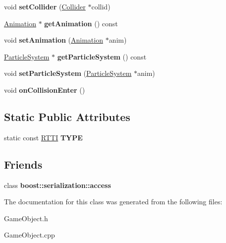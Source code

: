 \begin{DoxyCompactItemize}
\item 
\hypertarget{class_game_object_a1c60d09ac4284c98074c91c3f2a3bd76}{
void {\bfseries setCollider} (\hyperlink{class_collider}{Collider} $\ast$collid)}
\label{class_game_object_a1c60d09ac4284c98074c91c3f2a3bd76}

\item 
\hypertarget{class_game_object_a8ee01bb9d3bf665bcdd7b01d0afa0f83}{
\hyperlink{class_animation}{Animation} $\ast$ {\bfseries getAnimation} () const }
\label{class_game_object_a8ee01bb9d3bf665bcdd7b01d0afa0f83}

\item 
\hypertarget{class_game_object_a843c29431fdc35c948d7049eea8d4a5d}{
void {\bfseries setAnimation} (\hyperlink{class_animation}{Animation} $\ast$anim)}
\label{class_game_object_a843c29431fdc35c948d7049eea8d4a5d}

\item 
\hypertarget{class_game_object_af346844a9eb537a6f5255b4af5c52439}{
\hyperlink{class_particle_system}{ParticleSystem} $\ast$ {\bfseries getParticleSystem} () const }
\label{class_game_object_af346844a9eb537a6f5255b4af5c52439}

\item 
\hypertarget{class_game_object_a3b85c8ce97b7720349707d92fc71c273}{
void {\bfseries setParticleSystem} (\hyperlink{class_particle_system}{ParticleSystem} $\ast$anim)}
\label{class_game_object_a3b85c8ce97b7720349707d92fc71c273}

\item 
\hypertarget{class_game_object_a7fddf97069213113a53d993a29255985}{
void {\bfseries onCollisionEnter} ()}
\label{class_game_object_a7fddf97069213113a53d993a29255985}

\end{DoxyCompactItemize}
\subsection*{Static Public Attributes}
\begin{DoxyCompactItemize}
\item 
\hypertarget{class_game_object_a5dce9d375b69a47b73ce1dd53bf01cc6}{
static const \hyperlink{class_r_t_t_i}{RTTI} {\bfseries TYPE}}
\label{class_game_object_a5dce9d375b69a47b73ce1dd53bf01cc6}

\end{DoxyCompactItemize}
\subsection*{Friends}
\begin{DoxyCompactItemize}
\item 
\hypertarget{class_game_object_ac98d07dd8f7b70e16ccb9a01abf56b9c}{
class {\bfseries boost::serialization::access}}
\label{class_game_object_ac98d07dd8f7b70e16ccb9a01abf56b9c}

\end{DoxyCompactItemize}


The documentation for this class was generated from the following files:\begin{DoxyCompactItemize}
\item 
GameObject.h\item 
GameObject.cpp\end{DoxyCompactItemize}
